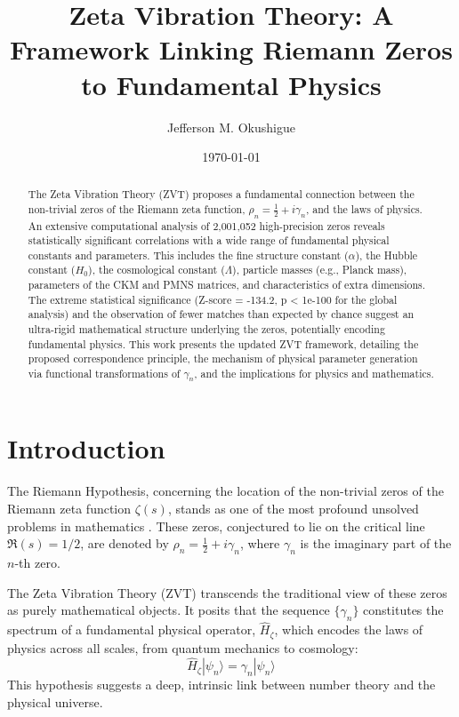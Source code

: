 \documentclass[12pt, twocolumn, reprint, amsmath, amssymb, aps]{revtex4-2}
\newcommand{\riemannzeros}{\{\gamma_n\}}
\newcommand{\hamiltonian}{\hat{H}_{\zeta}}
\begin{document}
\title{Zeta Vibration Theory: A Framework Linking Riemann Zeros to Fundamental Physics}
\author{Jefferson M. Okushigue}

\date{\today}
\begin{abstract}
The Zeta Vibration Theory (ZVT) proposes a fundamental connection between the non-trivial zeros of the Riemann zeta function, $\rho_n = \frac{1}{2} + i\gamma_n$, and the laws of physics. An extensive computational analysis of 2,001,052 high-precision zeros reveals statistically significant correlations with a wide range of fundamental physical constants and parameters. This includes the fine structure constant ($\alpha$), the Hubble constant ($H_0$), the cosmological constant ($\Lambda$), particle masses (e.g., Planck mass), parameters of the CKM and PMNS matrices, and characteristics of extra dimensions. The extreme statistical significance (Z-score = -134.2, p < 1e-100 for the global analysis) and the observation of fewer matches than expected by chance suggest an ultra-rigid mathematical structure underlying the zeros, potentially encoding fundamental physics. This work presents the updated ZVT framework, detailing the proposed correspondence principle, the mechanism of physical parameter generation via functional transformations of $\gamma_n$, and the implications for physics and mathematics.
\end{abstract}

\maketitle

\section{Introduction}
\label{sec:intro}
The Riemann Hypothesis, concerning the location of the non-trivial zeros of the Riemann zeta function $\zeta(s)$, stands as one of the most profound unsolved problems in mathematics \cite{riemann1859, edwards1974}. These zeros, conjectured to lie on the critical line $\Re(s) = 1/2$, are denoted by $\rho_n = \frac{1}{2} + i\gamma_n$, where $\gamma_n$ is the imaginary part of the $n$-th zero.

The Zeta Vibration Theory (ZVT) transcends the traditional view of these zeros as purely mathematical objects. It posits that the sequence $\riemannzeros$ constitutes the spectrum of a fundamental physical operator, $\hamiltonian$, which encodes the laws of physics across all scales, from quantum mechanics to cosmology:
\begin{equation}
    \hamiltonian | \psi_n \rangle = \gamma_n | \psi_n \rangle
\end{equation}
This hypothesis suggests a deep, intrinsic link between number theory and the physical universe.
\end{document}
